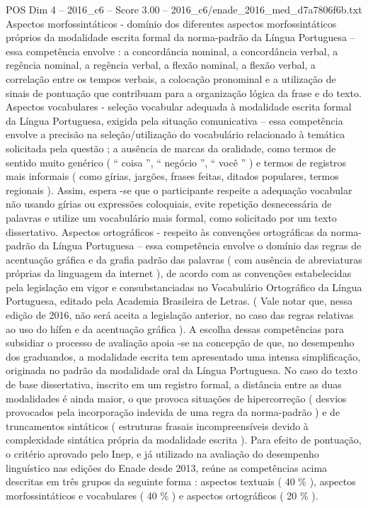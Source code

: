 \begin{textsample}{POS Dim 4 – 2016\_c6 – Score 3.00 – 2016\_c6/enade\_2016\_med\_d7a7806f6b.txt}
Aspectos morfossintáticos - domínio dos diferentes aspectos morfossintáticos próprios da modalidade escrita formal da norma-padrão da Língua Portuguesa – essa competência envolve : a concordância nominal, a concordância verbal, a regência nominal, a regência verbal, a flexão nominal, a flexão verbal, a correlação entre os tempos verbais, a colocação pronominal e a utilização de sinais de pontuação que contribuam para a organização lógica da frase e do texto.
Aspectos vocabulares - seleção vocabular adequada à modalidade escrita formal da Língua Portuguesa, exigida pela situação comunicativa – essa competência envolve a precisão na seleção/utilização do vocabulário relacionado à temática solicitada pela questão ; a ausência de marcas da oralidade, como termos de sentido muito genérico ( “ coisa ”, “ negócio ”, “ você ” ) e termos de registros mais informais ( como gírias, jargões, frases feitas, ditados populares, termos regionais ).
Assim, espera -se que o participante respeite a adequação vocabular não usando gírias ou expressões coloquiais, evite repetição desnecessária de palavras e utilize um vocabulário mais formal, como solicitado por um texto dissertativo.
Aspectos ortográficos - respeito às convenções ortográficas da norma-padrão da Língua Portuguesa – essa competência envolve o domínio das regras de acentuação gráfica e da grafia padrão das palavras ( com ausência de abreviaturas próprias da linguagem da internet ), de acordo com as convenções estabelecidas pela legislação em vigor e consubstanciadas no Vocabulário Ortográfico da Língua Portuguesa, editado pela Academia Brasileira de Letras. ( Vale notar que, nessa edição de 2016, não será aceita a legislação anterior, no caso das regras relativas ao uso do hífen e da acentuação gráfica ).
A escolha dessas competências para subsidiar o processo de avaliação apoia -se na concepção de que, no desempenho dos graduandos, a modalidade escrita tem apresentado uma intensa simplificação, originada no padrão da modalidade oral da Língua Portuguesa.
No caso do texto de base dissertativa, inscrito em um registro formal, a distância entre as duas modalidades é ainda maior, o que provoca situações de hipercorreção ( desvios provocados pela incorporação indevida de uma regra da norma-padrão ) e de truncamentos sintáticos ( estruturas frasais incompreensíveis devido à complexidade sintática própria da modalidade escrita ).
Para efeito de pontuação, o critério aprovado pelo Inep, e já utilizado na avaliação do desempenho linguístico nas edições do Enade desde 2013, reúne as competências acima descritas em três grupos da seguinte forma : aspectos textuais ( 40 \% ), aspectos morfossintáticos e vocabulares ( 40 \% ) e aspectos ortográficos ( 20 \% ).

\end{textsample}
